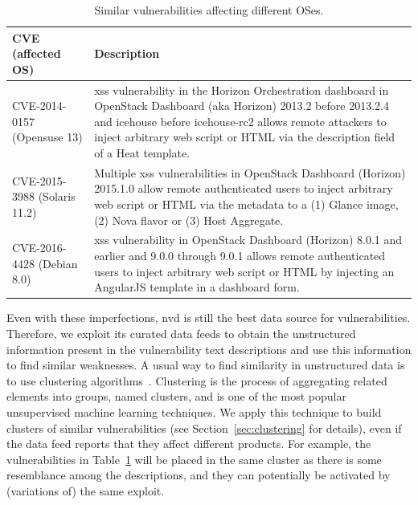 \begin{table}[!t]
\begin{center}
{\scriptsize
\begin{tabular}{| p{2.3cm} | p{10cm} | }\hline
\textbf{CVE (affected OS)} & \textbf{Description} \\\hline\hline
CVE-2014-0157 (Opensuse 13) & \scriptsize \gls{xss} vulnerability in the Horizon Orchestration dashboard in OpenStack Dashboard (aka Horizon) 2013.2 before 2013.2.4 and icehouse before icehouse-rc2 allows remote attackers to inject arbitrary web script or HTML via the description field of a Heat template. \\ \hline
CVE-2015-3988 (Solaris 11.2) & \scriptsize Multiple \gls{xss} vulnerabilities in OpenStack Dashboard (Horizon) 2015.1.0 allow remote authenticated users to inject arbitrary web script or HTML via the metadata to a (1) Glance image, (2) Nova flavor or (3) Host Aggregate. \\ \hline
CVE-2016-4428 (Debian 8.0) & \scriptsize \gls{xss} vulnerability in OpenStack Dashboard (Horizon) 8.0.1 and earlier and 9.0.0 through 9.0.1 allows remote authenticated users to inject arbitrary web script or HTML by injecting an AngularJS template in a dashboard form. \\ \hline
\end{tabular}
}
\caption{Similar vulnerabilities affecting different OSes.}
\label{tab:missing_products}
\end{center}
\end{table}

Even with these imperfections, \gls{nvd} is still the best data source for vulnerabilities.
Therefore, we exploit its curated data feeds to obtain the unstructured information present in the vulnerability text descriptions and use this information to find similar weaknesses.
A usual way to find similarity in unstructured data is to use clustering algorithms~\cite{Jain:2010}.
Clustering is the process of aggregating related elements into groups, named clusters, and is one of the most popular unsupervised machine learning techniques. 
We apply this technique to build clusters of similar vulnerabilities (see Section~\ref{sec:clustering} for details), even if the data feed reports that they affect different products.
For example, the vulnerabilities in Table~\ref{tab:missing_products} will be placed in the same cluster as there is some resemblance among the descriptions, and they can potentially be activated by (variations of) the same exploit.

